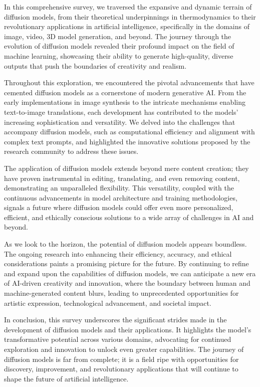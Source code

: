 In this comprehensive survey, we traversed the expansive and dynamic terrain of diffusion models, from their theoretical underpinnings in thermodynamics to their revolutionary applications in artificial intelligence, specifically in the domains of image, video, 3D model generation, and beyond. The journey through the evolution of diffusion models revealed their profound impact on the field of machine learning, showcasing their ability to generate high-quality, diverse outputs that push the boundaries of creativity and realism.

Throughout this exploration, we encountered the pivotal advancements that have cemented diffusion models as a cornerstone of modern generative AI. From the early implementations in image synthesis to the intricate mechanisms enabling text-to-image translations, each development has contributed to the models' increasing sophistication and versatility. We delved into the challenges that accompany diffusion models, such as computational efficiency and alignment with complex text prompts, and highlighted the innovative solutions proposed by the research community to address these issues.

The application of diffusion models extends beyond mere content creation; they have proven instrumental in editing, translating, and even removing content, demonstrating an unparalleled flexibility. This versatility, coupled with the continuous advancements in model architecture and training methodologies, signals a future where diffusion models could offer even more personalized, efficient, and ethically conscious solutions to a wide array of challenges in AI and beyond.

As we look to the horizon, the potential of diffusion models appears boundless. The ongoing research into enhancing their efficiency, accuracy, and ethical considerations paints a promising picture for the future. By continuing to refine and expand upon the capabilities of diffusion models, we can anticipate a new era of AI-driven creativity and innovation, where the boundary between human and machine-generated content blurs, leading to unprecedented opportunities for artistic expression, technological advancement, and societal impact.

In conclusion, this survey underscores the significant strides made in the development of diffusion models and their applications. It highlights the model's transformative potential across various domains, advocating for continued exploration and innovation to unlock even greater capabilities. The journey of diffusion models is far from complete; it is a field ripe with opportunities for discovery, improvement, and revolutionary applications that will continue to shape the future of artificial intelligence.